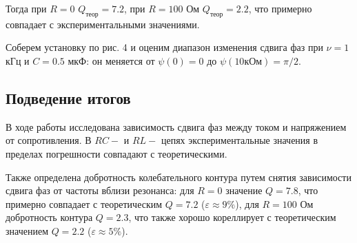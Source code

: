 \documentclass[12pt,a4paper]{article}
\begin{document}
Тогда при $R = 0$ $Q_{теор} = 7.2$, при $R = 100$ Ом $Q_{теор} = 2.2$, что примерно совпадает с экспериментальными значениями.
\newline

Соберем установку по рис. 4 и оценим диапазон изменения сдвига фаз при $\nu = 1$ кГц и $C = 0.5$ мкФ: он меняется от $\psi(0) = 0$ до $\psi(10кОм) = \pi/2$.

\subsection*{Подведение итогов}
В ходе работы исследована зависимость сдвига фаз между током и напряжением от сопротивления. 
В $RC-$ и $RL-$ цепях экспериментальные значения в пределах погрешности совпадают с теоретическими.


Также определена добротность колебательного контура путем снятия зависимости сдвига фаз от частоты вблизи резонанса: для $R = 0$ значение $Q = 7.8$, что примерно совпадает с теоретическим $Q=7.2$ ($\varepsilon \approx 9\%$), для $R=100$ Ом добротность контура $Q = 2.3$, что также хорошо кореллирует с теоретическим значением $Q = 2.2$ ($\varepsilon \approx 5\%$).
\end{document}

